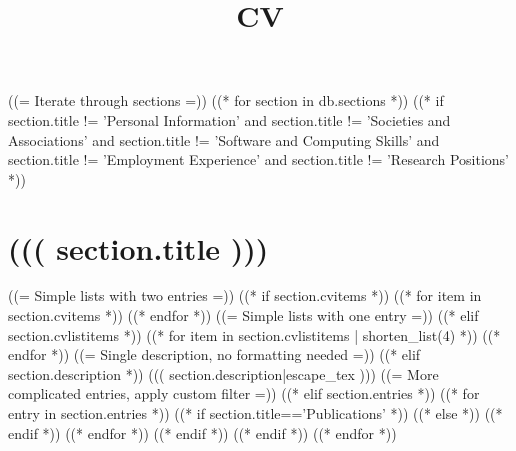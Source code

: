 \documentclass[10pt,a4paper,sans]{moderncv}
\title{CV}
\begin{document}
  \makecvtitle
  ((= Iterate through sections =))
  ((* for section in db.sections *))
  ((* if section.title != 'Personal Information' and section.title != 'Societies and Associations' and section.title != 'Software and Computing Skills' and section.title != 'Employment Experience' and section.title != 'Research Positions' *))
  \section{((( section.title )))}
  ((= Simple lists with two entries =))
  ((* if section.cvitems *))
  ((* for item in section.cvitems *))
  ((* endfor *))
  ((= Simple lists with one entry =))
  ((* elif section.cvlistitems *))
  ((* for item in section.cvlistitems | shorten_list(4) *))
  ((* endfor *))
  ((= Single description, no formatting needed =))
  ((* elif section.description *))
  ((( section.description|escape_tex )))
  ((= More complicated entries, apply custom filter =))
  ((* elif section.entries *))
  ((* for entry in section.entries *))
  ((* if section.title=='Publications' *))
  ((* else *))
  ((* endif *))
  ((* endfor *))
  ((* endif *))
  ((* endif *))
  ((* endfor *))
\end{document}
